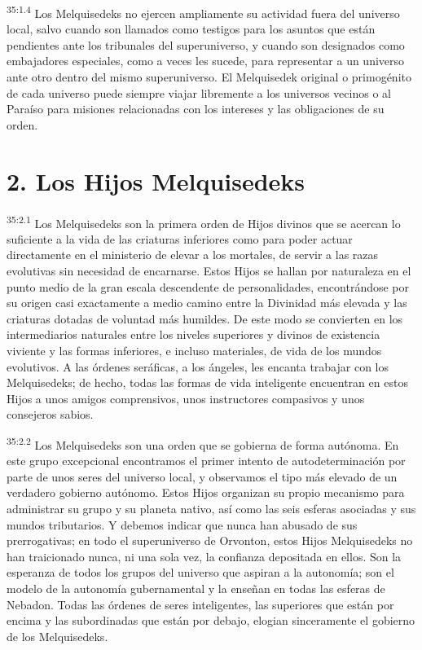 \par
\textsuperscript{35:1.4} Los Melquisedeks no ejercen ampliamente su actividad fuera del universo local, salvo cuando son llamados como testigos para los asuntos que están pendientes ante los tribunales del superuniverso, y cuando son designados como embajadores especiales, como a veces les sucede, para representar a un universo ante otro dentro del mismo superuniverso. El Melquisedek original o primogénito de cada universo puede siempre viajar libremente a los universos vecinos o al Paraíso para misiones relacionadas con los intereses y las obligaciones de su orden.

\section*{2. Los Hijos Melquisedeks}
\par
\textsuperscript{35:2.1} Los Melquisedeks son la primera orden de Hijos divinos que se acercan lo suficiente a la vida de las criaturas inferiores como para poder actuar directamente en el ministerio de elevar a los mortales, de servir a las razas evolutivas sin necesidad de encarnarse. Estos Hijos se hallan por naturaleza en el punto medio de la gran escala descendente de personalidades, encontrándose por su origen casi exactamente a medio camino entre la Divinidad más elevada y las criaturas dotadas de voluntad más humildes. De este modo se convierten en los intermediarios naturales entre los niveles superiores y divinos de existencia viviente y las formas inferiores, e incluso materiales, de vida de los mundos evolutivos. A las órdenes seráficas, a los ángeles, les encanta trabajar con los Melquisedeks; de hecho, todas las formas de vida inteligente encuentran en estos Hijos a unos amigos comprensivos, unos instructores compasivos y unos consejeros sabios.

\par
\textsuperscript{35:2.2} Los Melquisedeks son una orden que se gobierna de forma autónoma. En este grupo excepcional encontramos el primer intento de autodeterminación por parte de unos seres del universo local, y observamos el tipo más elevado de un verdadero gobierno autónomo. Estos Hijos organizan su propio mecanismo para administrar su grupo y su planeta nativo, así como las seis esferas asociadas y sus mundos tributarios. Y debemos indicar que nunca han abusado de sus prerrogativas; en todo el superuniverso de Orvonton, estos Hijos Melquisedeks no han traicionado nunca, ni una sola vez, la confianza depositada en ellos. Son la esperanza de todos los grupos del universo que aspiran a la autonomía; son el modelo de la autonomía gubernamental y la enseñan en todas las esferas de Nebadon. Todas las órdenes de seres inteligentes, las superiores que están por encima y las subordinadas que están por debajo, elogian sinceramente el gobierno de los Melquisedeks.

